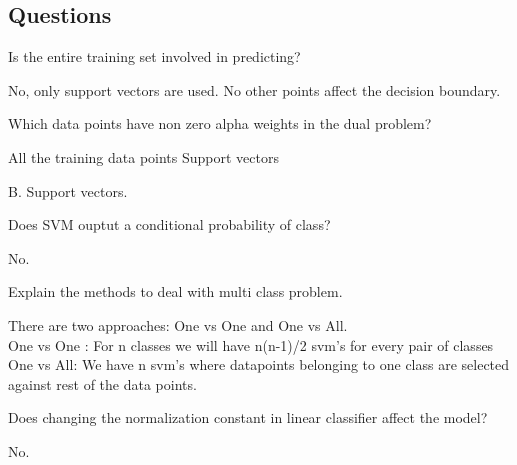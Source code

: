 \documentclass[12pt,letterpaper, onecolumn]{exam}
\begin{document}
\subsection*{Questions}
\begin{questions}
\question[] Is the entire training set involved in predicting?\\
\begin{Solution}
No, only support vectors are used. No other points affect the decision boundary.
\end{Solution}

\question[] Which data points have non zero alpha weights in the dual problem?
\begin{choices}
\choice All the training data points
\choice Support vectors
\end{choices}

\begin{Solution}
B. Support vectors.
\end{Solution}

\question[] Does SVM ouptut a conditional probability of class?\\
\begin{Solution}
No.
\end{Solution}

\question[] Explain the methods to deal with multi class problem.\\
\begin{Solution}
There are two approaches: One vs One and One vs All.\\
One vs One : For n classes we will have n(n-1)/2 svm's for every pair of classes
\\ One vs All: We have n svm's where datapoints belonging to one class are selected against rest of the data points.
\end{Solution}

\question[] Does changing the normalization constant in linear classifier affect the model?\\
\begin{Solution}
No.
\end{Solution}
\end{questions}
\end{document}
